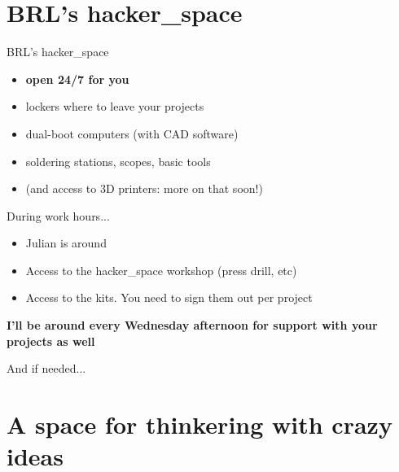 \documentclass[compress]{beamer}
\begin{document}
\section[hacker\_space]{BRL's hacker\_space}



\begin{frame}{BRL's hacker\_space}

    \begin{itemize}
        \item<1-> \textbf{open 24/7 for you}
        \item<2-> lockers where to leave your projects
        \item<3-> dual-boot computers (with CAD software)
        \item<3-> soldering stations, scopes, basic tools
        \item<4-> (and access to 3D printers: more on that soon!)
    \end{itemize}

\end{frame}


\begin{frame}{During work hours...}
    \begin{itemize}
        \item Julian is around
        \item Access to the hacker\_space workshop (press drill, etc)
        \item Access to the kits. You need to sign them out per project
    \end{itemize}
    \pause

    \centering
    \bf
    I'll be around every Wednesday afternoon for support with your projects as
    well
\end{frame}


\begin{frame}[plain]{}
    \centering
    \Large
    And if needed...
\end{frame}



\section{A space for thinkering with crazy ideas}
\end{document}
